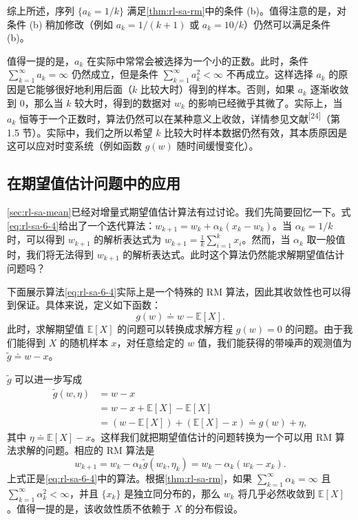综上所述，序列 $\{a_k = 1/k\}$ 满足\cref{thm:rl-sa-rm}中的条件 (b)。值得注意的是，对条件 (b) 稍加修改（例如 $a_k = 1/(k+1)$ 或 $a_k = 10/k$）仍然可以满足条件 (b)。

值得一提的是，$a_k$ 在实际中常常会被选择为一个小的正数。此时，条件 $\sum_{k=1}^{\infty} a_k = \infty$ 仍然成立，但是条件 $\sum_{k=1}^{\infty} a_k^2 < \infty$ 不再成立。这样选择 $a_k$ 的原因是它能够很好地利用后面（$k$ 比较大时）得到的样本。否则，如果 $a_k$ 逐渐收敛到 0，那么当 $k$ 较大时，得到的数据对 $w_k$ 的影响已经微乎其微了。实际上，当 $a_k$ 恒等于一个正数时，算法仍然可以在某种意义上收敛，详情参见文献\textsuperscript{[24]}（第 1.5 节）。实际中，我们之所以希望 $k$ 比较大时样本数据仍然有效，其本质原因是这可以应对时变系统（例如函数 $g(w)$ 随时间缓慢变化）。

\subsection{在期望值估计问题中的应用}
\label{sec:rl-sa-rm-mean}

\cref{sec:rl-sa-mean}已经对增量式期望值估计算法有过讨论。我们先简要回忆一下。式\eqref{eq:rl-sa-6-4}给出了一个迭代算法：$w_{k+1} = w_k + \alpha_k (x_k - w_k)$。当 $\alpha_k = 1/k$ 时，可以得到 $w_{k+1}$ 的解析表达式为 $w_{k+1} = \frac{1}{k}\sum_{i=1}^{k} x_i$。然而，当 $\alpha_k$ 取一般值时，我们将无法得到 $w_{k+1}$ 的解析表达式。此时这个算法仍然能求解期望值估计问题吗？

下面展示算法\eqref{eq:rl-sa-6-4}实际上是一个特殊的 RM 算法，因此其收敛性也可以得到保证。具体来说，定义如下函数：
\begin{equation}
g(w) \doteq w - \mathbb{E}[X].
\end{equation}
此时，求解期望值 $\mathbb{E}[X]$ 的问题可以转换成求解方程 $g(w) = 0$ 的问题。由于我们能得到 $X$ 的随机样本 $x$，对任意给定的 $w$ 值，我们能获得的带噪声的观测值为 $\tilde{g} \doteq w - x$。

$\tilde{g}$ 可以进一步写成
\begin{equation}
\begin{aligned}
\tilde{g}(w, \eta) &= w - x \\
&= w - x + \mathbb{E}[X] - \mathbb{E}[X] \\
&= (w - \mathbb{E}[X]) + (\mathbb{E}[X] - x) \doteq g(w) + \eta,
\end{aligned}
\end{equation}
其中 $\eta \doteq \mathbb{E}[X] - x$。这样我们就把期望值估计的问题转换为一个可以用 RM 算法求解的问题。相应的 RM 算法是
\begin{equation}
w_{k+1} = w_k - \alpha_k \tilde{g}(w_k, \eta_k) = w_k - \alpha_k (w_k - x_k).
\end{equation}
上式正是\eqref{eq:rl-sa-6-4}中的算法。根据\cref{thm:rl-sa-rm}，如果 $\sum_{k=1}^{\infty} \alpha_k = \infty$ 且 $\sum_{k=1}^{\infty} \alpha_k^2 < \infty$，并且 $\{x_k\}$ 是独立同分布的，那么 $w_k$ 将几乎必然收敛到 $\mathbb{E}[X]$。值得一提的是，该收敛性质不依赖于 $X$ 的分布假设。

